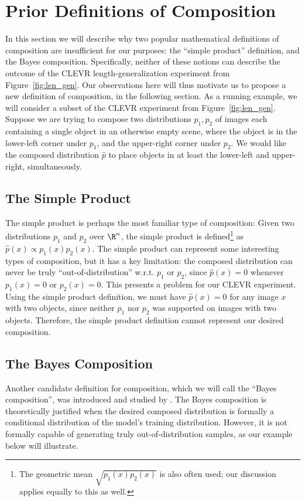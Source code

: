 \section{Prior Definitions of Composition}
\label{sec:problematic-compositions}


In this section we will describe why two popular mathematical definitions of composition are insufficient
for our purposes: the ``simple product'' definition, and the Bayes composition.
Specifically, neither of these notions can describe
the outcome of the CLEVR length-generalization experiment from Figure~\ref{fig:len_gen}.
Our observations here will thus motivate us to propose a new definition of composition,
in the following section. As a running example, we will consider a subset of the CLEVR experiment from Figure~\ref{fig:len_gen}.
Suppose we are trying to compose two distributions $p_1, p_2$ of images each containing a single object in an otherwise empty scene, where the object is in the lower-left corner under $p_1$, and the upper-right corner under $p_2$.
We would like the composed distribution $\hat{p}$ to place objects in at least
the lower-left and upper-right, simultaneously.

\subsection{The Simple Product}
The simple product is perhaps the most familiar type of composition:
Given two distributions $p_1$ and $p_2$ over $\R^n$,
the simple product is defined\footnote{The geometric mean $\sqrt{p_1(x)p_2(x)}$ is also often used; our discussion applies equally to this as well.} as
$\hat{p}(x) \propto p_1(x) p_2(x)$.
The simple product can represent some interesting types of composition, but it 
has a key limitation: 
the composed distribution can never be truly ``out-of-distribution'' w.r.t. $p_1$ or $p_2$,
since $\hat{p}(x) = 0$ whenever $p_1(x) =0$ or $p_2(x) = 0$.
This presents a problem for our CLEVR experiment.
Using the simple product definition,
we must have $\hat{p}(x) = 0$ for any image $x$ with two objects,
since neither $p_1$ nor $p_2$ was supported on images with two objects.
Therefore, the simple product definition cannot represent our
desired composition. %

\subsection{The Bayes Composition}
Another candidate definition for composition, which we will call the ``Bayes composition'', was introduced and studied by \citet{du2023reduce,liu2022compositional}.
The Bayes composition is theoretically justified
when the desired composed distribution is formally a conditional distribution
of the model's training distribution.
However, it is not formally capable of generating truly
out-of-distribution samples, as our example below will illustrate.

